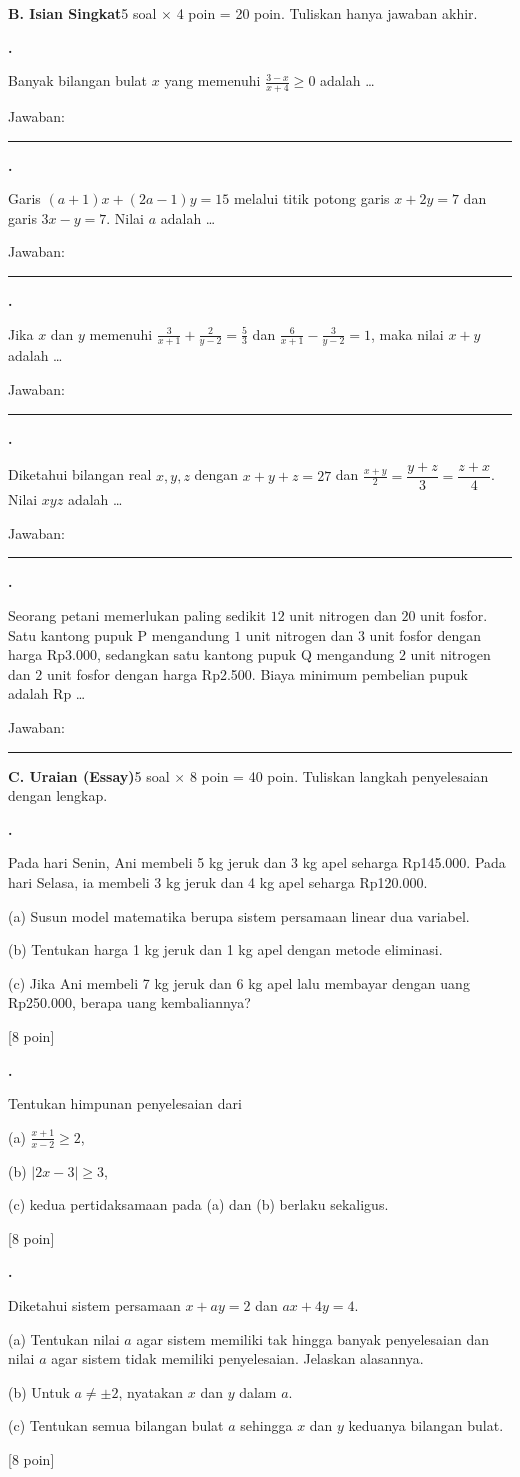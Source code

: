\documentclass[a4paper,11pt]{article}
\newcommand{\dis}{\displaystyle}
\newcounter{no}
\newcommand{\bagian}[2]{\par\Needspace{6\baselineskip}\vspace{1.0em}\noindent
  \begin{tcolorbox}[colback=navy,colframe=navy,coltext=white,boxrule=0pt,arc=2pt,left=6pt,right=6pt,top=3pt,bottom=3pt]
  \textbf{#1}\hfill{\small #2}\end{tcolorbox}\setcounter{no}{0}\par\vspace{-0.3em}}
\newcommand{\soal}[2]{\par\vspace{0.75em}\stepcounter{no}\noindent
  \begin{minipage}[t]{1.8em}\textbf{\theno.}\end{minipage}%
  \begin{minipage}[t]{\dimexpr\linewidth-1.8em\relax}#1\par\vspace{0.35em}#2\end{minipage}\par}
\newcommand{\poin}[1]{\hfill{\small\color{navy}[#1 poin]}}
\newcommand{\jwb}{\hfill Jawaban: \rule{4.5cm}{0.4pt}}
\begin{document}
\bagian{B. Isian Singkat}{5 soal $\times$ 4 poin = 20 poin. Tuliskan hanya jawaban akhir.}
\soal{Banyak bilangan bulat $x$ yang memenuhi $\dis\frac{3-x}{x+4}\ge0$ adalah \dots}{\jwb}
\soal{Garis $(a+1)x+(2a-1)y=15$ melalui titik potong garis $x+2y=7$ dan garis $3x-y=7$. Nilai $a$ adalah \dots}{\jwb}
\soal{Jika $x$ dan $y$ memenuhi $\dis\frac{3}{x+1}+\dis\frac{2}{y-2}=\dis\frac53$ dan $\dis\frac{6}{x+1}-\dis\frac{3}{y-2}=1$, maka nilai $x+y$ adalah \dots}{\jwb}
\soal{Diketahui bilangan real $x,y,z$ dengan $x+y+z=27$ dan $\dis\frac{x+y}{2}=\dfrac{y+z}{3}=\dfrac{z+x}{4}$. Nilai $xyz$ adalah \dots}{\jwb}
\soal{Seorang petani memerlukan paling sedikit $12$ unit nitrogen dan $20$ unit fosfor. Satu kantong pupuk P mengandung $1$ unit nitrogen dan $3$ unit fosfor dengan harga Rp3.000, sedangkan satu kantong pupuk Q mengandung $2$ unit nitrogen dan $2$ unit fosfor dengan harga Rp2.500. Biaya minimum pembelian pupuk adalah Rp \dots}{\jwb}
\bagian{C. Uraian (Essay)}{5 soal $\times$ 8 poin = 40 poin. Tuliskan langkah penyelesaian dengan lengkap.}
\soal{Pada hari Senin, Ani membeli 5 kg jeruk dan 3 kg apel seharga Rp145.000. Pada hari Selasa, ia membeli 3 kg jeruk dan 4 kg apel seharga Rp120.000.\par\smallskip\hspace*{0.3em}(a) Susun model matematika berupa sistem persamaan linear dua variabel.\par\hspace*{0.3em}(b) Tentukan harga 1 kg jeruk dan 1 kg apel dengan metode eliminasi.\par\hspace*{0.3em}(c) Jika Ani membeli 7 kg jeruk dan 6 kg apel lalu membayar dengan uang Rp250.000, berapa uang kembaliannya?}{\poin{8}}
\soal{Tentukan himpunan penyelesaian dari\par\smallskip\hspace*{0.3em}(a) $\dis\frac{x+1}{x-2}\ge2$,\par\hspace*{0.3em}(b) $|2x-3|\ge3$,\par\hspace*{0.3em}(c) kedua pertidaksamaan pada (a) dan (b) berlaku sekaligus.}{\poin{8}}
\soal{Diketahui sistem persamaan $x+ay=2$ dan $ax+4y=4$.\par\smallskip\hspace*{0.3em}(a) Tentukan nilai $a$ agar sistem memiliki tak hingga banyak penyelesaian dan nilai $a$ agar sistem tidak memiliki penyelesaian. Jelaskan alasannya.\par\hspace*{0.3em}(b) Untuk $a\neq\pm2$, nyatakan $x$ dan $y$ dalam $a$.\par\hspace*{0.3em}(c) Tentukan semua bilangan bulat $a$ sehingga $x$ dan $y$ keduanya bilangan bulat.}{\poin{8}}
\end{document}
